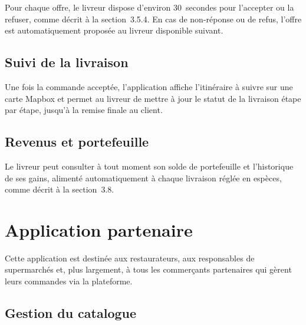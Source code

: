 \documentclass[12pt,fleqn,a4paper]{report}
\begin{document}
\begin{justify}
Pour chaque offre, le livreur dispose d'environ 30~secondes pour l'accepter ou la refuser, comme décrit à la section~3.5.4. En cas de non-réponse ou de refus, l'offre est automatiquement proposée au livreur disponible suivant.

\subsection{Suivi de la livraison}


Une fois la commande acceptée, l'application affiche l'itinéraire à suivre sur une carte Mapbox et permet au livreur de mettre à jour le statut de la livraison étape par étape, jusqu'à la remise finale au client.

\subsection{Revenus et portefeuille}


Le livreur peut consulter à tout moment son solde de portefeuille et l'historique de ses gains, alimenté automatiquement à chaque livraison réglée en espèces, comme décrit à la section~3.8.

\section{Application partenaire}

Cette application est destinée aux restaurateurs, aux responsables de supermarchés et, plus largement, à tous les commerçants partenaires qui gèrent leurs commandes via la plateforme.

\subsection{Gestion du catalogue}


\end{justify}
\end{document}

